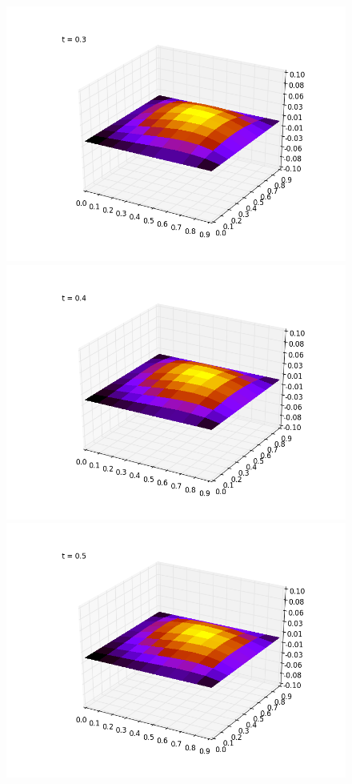 \documentclass[paper=a4, fontsize=13pt]{scrartcl} %
\numberwithin{equation}{section} %
\numberwithin{figure}{section} %
\numberwithin{table}{section} %
\begin{document}
\begin{figure}[!htb]
  \includegraphics[width=\linewidth]{3}
\endminipage\hfill
{}
  \includegraphics[width=\linewidth]{4}
\endminipage\hfill
{}%
  \includegraphics[width=\linewidth]{5}
\endminipage
\end{figure}
\end{document}
